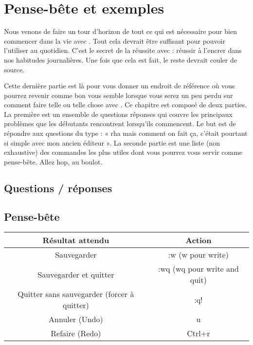 \chapter{Pense-bête et exemples}

Nous venons de faire un tour d'horizon de tout ce qui est nécessaire pour bien commencer dans la vie avec \vim. Tout cela devrait être suffisant pour pouvoir l'utiliser au quotidien. C'est le secret de la réussite avec \vim : réussir à l'encrer dans nos habitudes journalières. Une fois que cela est fait, le reste devrait couler de source.

Cette dernière partie est là pour vous donner un endroit de référence où vous pourrez revenir comme bon vous semble lorsque vous serez un peu perdu sur comment faire telle ou telle chose avec \vim. Ce chapitre est composé de deux parties. La première est un ensemble de questions réponses qui couvre les principaux problèmes que les débutants rencontrent lorsqu'ils commencent. Le but est de répondre aux questions du type : « rha mais comment on fait ça, c'était pourtant si simple avec mon ancien éditeur ». La seconde partie est une liste (non exhaustive) des commandes \vim les plus utiles dont vous pourrez vous servir comme pense-bête. Allez hop, au boulot.

\section{Questions / réponses}

\section{Pense-bête}

\bigskip
\begin{tabular}[H]{|c|c|}
  \hline
  Résultat attendu & Action\\
  \hline
  Sauvegarder & :w (w pour write)\\
  Sauvegarder et quitter & :wq (wq pour write and quit)\\
  Quitter sans sauvegarder (forcer à quitter) & :q! \\
  Annuler (Undo) & u \\
  Refaire (Redo) & Ctrl+r \\
  \hline
\end{tabular}
\bigskip

